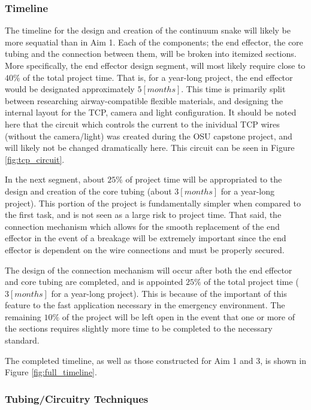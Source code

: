 	\subsubsection{Timeline}
	
		The timeline for the design and creation of the continuum snake will likely be more sequatial than in Aim 1. Each of the components; the end effector, the core tubing and the connection between them, will be broken into itemized sections. More specifically, the end effector design segment, will most likely require close to $40\%$ of the total project time. That is, for a year-long project, the end effector would be designated approximately $5[months]$. This time is primarily split between researching airway-compatible flexible materials, and designing the internal layout for the TCP, camera and light configuration. It should be noted here that the circuit which controls the current to the inividual TCP wires (without the camera/light) was created during the OSU capstone project, and will likely not be changed dramatically here. This circuit can be seen in Figure \ref{fig:tcp_circuit}.
		
		In the next segment, about $25\%$ of project time will be appropriated to the design and creation of the core tubing (about $3[months]$ for a year-long project). This portion of the project is fundamentally simpler when compared to the first task, and is not seen as a large risk to project time. That said, the connection mechanism which allows for the smooth replacement of the end effector in the event of a breakage will be extremely important since the end effector is dependent on the wire connections and must be properly secured.
		
		The design of the connection mechanism will occur after both the end effector and core tubing are completed, and is appointed $25\%$ of the total project time ($3[months]$ for a year-long project). This is because of the important of this feature to the fast application necessary in the emergency environment. The remaining $10\%$ of the project will be left open in the event that one or more of the sections requires slightly more time to be completed to the necessary standard.
		
		The completed timeline, as well as those constructed for Aim 1 and 3, is shown in Figure \ref{fig:full_timeline}.
	
	\subsubsection{Tubing/Circuitry Techniques}

